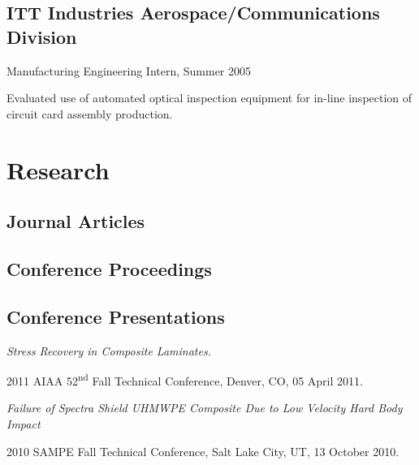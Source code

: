 \documentclass[10pt,letterpaper]{article}
\renewenvironment{itemize}{
  \begin{list}{}{
    \setlength{\leftmargin}{1.5em}
    \setlength{\itemsep}{0.25em}
    \setlength{\parskip}{0pt}
    \setlength{\parsep}{0.25em}
  }
}{
  \end{list}
}
\begin{document}
\subsection*{ITT Industries Aerospace/Communications Division}

\begin{itemize}
\item Manufacturing Engineering Intern, Summer 2005
    \begin{itemize}
    \item Evaluated use of automated optical inspection equipment for in-line inspection of circuit card assembly production.
    \end{itemize}
\end{itemize}

%
%

\section*{Research}

\subsection*{Journal Articles}
\begin{itemize}
\item {}
\end{itemize}

\subsection*{Conference Proceedings}
\begin{itemize}
\item {}
\item {}
\end{itemize}

\subsection*{Conference Presentations}
\begin{itemize}
\item \textit{Stress Recovery in Composite Laminates.}
  \begin{itemize}
  \item 2011 AIAA 52\textsuperscript{nd} Fall Technical Conference,
    Denver, CO,
    05 April 2011.
  \end{itemize}
\item \textit{Failure of Spectra Shield UHMWPE Composite Due to Low Velocity Hard Body Impact}
  \begin{itemize}
  \item 2010 SAMPE Fall Technical Conference,
    Salt Lake City, UT,
    13 October 2010.
  \end{itemize}
\end{itemize}
\end{document}
